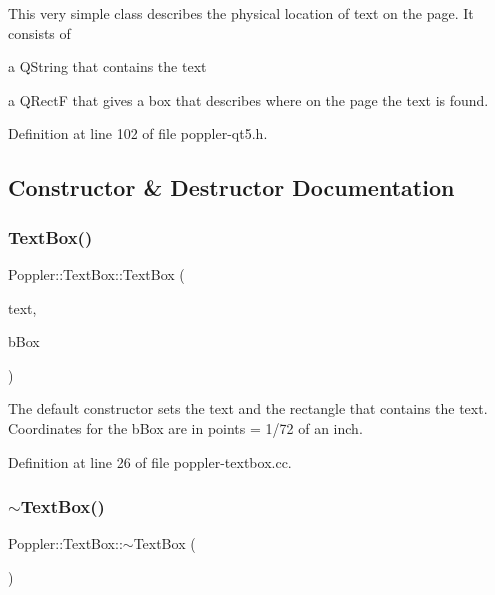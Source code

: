 This very simple class describes the physical location of text on the page. It consists of
\begin{DoxyItemize}
\item a Q\+String that contains the text
\item a Q\+RectF that gives a box that describes where on the page the text is found. 
\end{DoxyItemize}

Definition at line 102 of file poppler-\/qt5.\+h.



\subsection{Constructor \& Destructor Documentation}
\mbox{\label{class_poppler_1_1_text_box_a30ecac65b16336a142f6e22a11deba16}} 
\subsubsection{\texorpdfstring{Text\+Box()}{TextBox()}}
{\footnotesize\ttfamily Poppler\+::\+Text\+Box\+::\+Text\+Box (\begin{DoxyParamCaption}\item[{const Q\+String \&}]{text,  }\item[{const Q\+RectF \&}]{b\+Box }\end{DoxyParamCaption})}

The default constructor sets the {\ttfamily text} and the rectangle that contains the text. Coordinates for the {\ttfamily b\+Box} are in points = 1/72 of an inch. 

Definition at line 26 of file poppler-\/textbox.\+cc.

\mbox{\label{class_poppler_1_1_text_box_ab7c26a4f5846bd476aca0407178c5b52}} 
\subsubsection{\texorpdfstring{$\sim$\+Text\+Box()}{~TextBox()}}
{\footnotesize\ttfamily Poppler\+::\+Text\+Box\+::$\sim$\+Text\+Box (\begin{DoxyParamCaption}{ }\end{DoxyParamCaption})}

